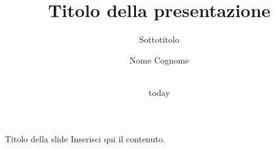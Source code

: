 \documentclass[aspectratio=169]{beamer}
\title{Titolo della presentazione}
\subtitle{Sottotitolo}
\author{Nome Cognome}
\affiliation{UISP Nuoto}
\date{\\today}
\begin{document}
\maketitle
{}
\begin{frame}{Titolo della slide}
  Inserisci qui il contenuto.
\end{frame}
\end{document}
